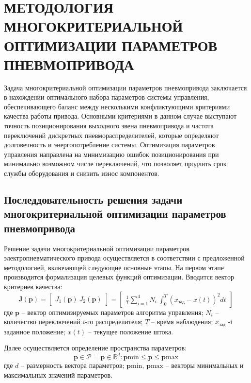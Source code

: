\chapter{МЕТОДОЛОГИЯ МНОГОКРИТЕРИАЛЬНОЙ ОПТИМИЗАЦИИ ПАРАМЕТРОВ ПНЕВМОПРИВОДА}\label{ch:ch4}

Задача многокритериальной оптимизации параметров пневмопривода
заключается в нахождении оптимального набора параметров системы
управления, обеспечивающего баланс между несколькими конфликтующими
критериями качества работы привода. Основными критериями в данном случае
выступают точность позиционирования выходного звена пневмопривода и
частота переключений дискретных пневмораспределителей, которые определяют
долговечность и энергопотребление системы. Оптимизация параметров управления
направлена на минимизацию ошибок позиционирования при минимально возможном числе
переключений, что позволяет продлить срок службы оборудования и снизить износ компонентов.

\section{Последдовательность решения задачи многокритериальной оптимизации параметров пневмопривода}\label{ch:ch4/sec1}

Решение задачи многокритериальной оптимизации параметров электропневматического привода осуществляется в соответствии с
предложенной методологией, включающей следующие основные этапы.
На первом этапе производится формализация целевых
функций оптимизации. Вводится вектор критериев качества:
\begin{equation}
\mathbf{J}(\mathbf{p}) = \begin{bmatrix}
J_1(\mathbf{p}) \
J_2(\mathbf{p})
\end{bmatrix} = \begin{bmatrix}
\frac{1}{T}\sum_{i=1}^{4}N_i \
\int_0^T (x_{\text{зад}} - x(t))^2 dt
\end{bmatrix}
\end{equation}
где $\mathbf{p}$ -- вектор оптимизируемых параметров алгоритма управления;
$N_i$ -- количество переключений $i$-го распределителя;
$T$ -- время наблюдения;
$x_{\text{зад}}$ -i заданное положение;
$x(t)$ -- текущее положение штока.

Далее осуществляется определение пространства параметров:
\begin{equation}
\mathbf{p} \in \mathcal{P} = {\mathbf{p} \in \mathbb{R}^d: \mathbf{p}{\text{min}} \leq \mathbf{p} \leq \mathbf{p}{\text{max}}}
\end{equation}
где $d$ -- размерность вектора параметров;
$\mathbf{p}{\text{min}}$, $\mathbf{p}{\text{max}}$ -- векторы минимальных и максимальных значений параметров.

